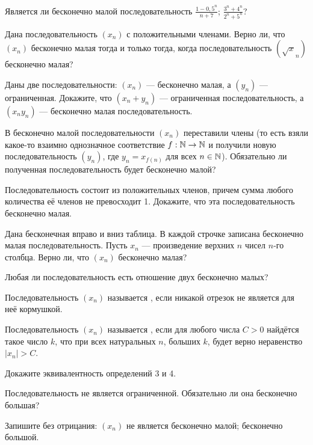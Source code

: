 \documentclass[a4paper,11pt]{article}
\begin{document}
 Является ли бесконечно малой последовательность
$\frac{1-0,5^n}{n+7}$;
$\frac{3^n+4^n}{2^n+5^n}$?



 Дана последовательность $(x_n)$ с положительными членами.
Верно ли, что $(x_n)$ бесконечно малая
тогда и только тогда, когда последовательность $(\sqrt x_n)$
бесконечно малая?

 Даны две последовательности: $(x_n)$ --- бесконечно малая,
а $(y_n)$ --- ограниченная.
Докажите, что  $(x_n+y_n)$ --- ограниченная последовательность,
а $(x_ny_n)$ --- бесконечно малая последовательность.

 В бесконечно малой последовательности $(x_n)$
переставили члены (то есть взяли какое-то взаимно однозначное соответствие
$f:\mathbb{N}\rightarrow\mathbb{N}$ и получили новую последовательность $(y_n)$,
где $y_n=x_{f(n)}$ для всех $n\in\mathbb{N}$).
Обязательно ли полученная последовательность
будет бесконечно малой?



 Последовательность состоит из положительных
членов, причем сумма любого количества е\"е членов не превосходит 1.
Докажите, что эта последовательность бесконечно малая.




Дана бесконечная вправо и вниз таблица.
В каждой строчке записана бесконечно малая последовательность.
Пусть $x_n$ --- произведение верхних $n$ чисел $n$-го столбца.
Верно ли, что $(x_n)$ бесконечно малая?



 Любая ли последовательность есть отношение двух бесконечно малых? %



 Последовательность $(x_n)$ называется , если
никакой отрезок не является для неё кормушкой.

 Последовательность $(x_n)$ называется , если
для любого числа $C>0$ найдётся такое число $k$, что при всех
натуральных $n$, больших $k$,
будет верно неравенство
$|x_n|>C$.

Докажите эквивалентность определений 3 и 4.

 Последовательность не является ограниченной.
Обязательно ли она бесконечно большая?

Запишите без отрицания: %
$(x_n)$ не  является
 бесконечно малой;
 бесконечно большой.
\end{document}
